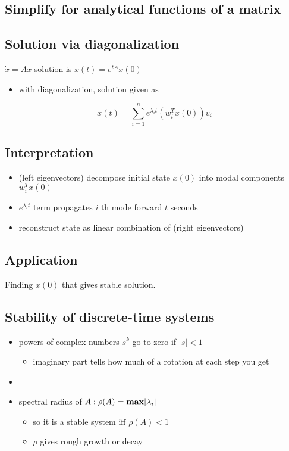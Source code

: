 \documentclass[10pt,letterpaper]{article}
\begin{document}
\subsection{Simplify for analytical functions of a matrix}
\label{sec-11_9}
\subsection{Solution via diagonalization}
\label{sec-11_10}

$\dot x=Ax$ solution is $x(t)=e ^{tA} x(0)$
\begin{itemize}
\item with diagonalization, solution given as
\end{itemize}
$$
x(t) = \sum ^{n} _{i=1} e ^{\lambda_i t} (w_i ^{T} x(0))v_i
$$ 
\subsection{Interpretation}
\label{sec-11_11}

\begin{itemize}
\item (left eigenvectors) decompose initial state $x(0)$ into modal components $w ^{T} _{i} x(0)$
\item $e ^{\lambda_i t}$ term propagates $i$ th mode forward $t$ seconds
\item reconstruct state as linear combination of (right eigenvectors)
\end{itemize}
\subsection{Application}
\label{sec-11_12}

Finding $x(0)$ that gives stable solution.
\subsection{Stability of discrete-time systems}
\label{sec-11_13}

\begin{itemize}
\item powers of complex numbers $s^k$ go to zero if $|s|<1$

\begin{itemize}
\item imaginary part tells how much of a rotation at each step you get
\end{itemize}

\item {}
\item spectral radius of $A:\rho (A)= {\bf max} |\lambda _i |$

\begin{itemize}
\item so it is a stable system iff $\rho(A)<1$
\item $\rho$ gives rough growth or decay
\end{itemize}

\end{itemize}
\end{document}
